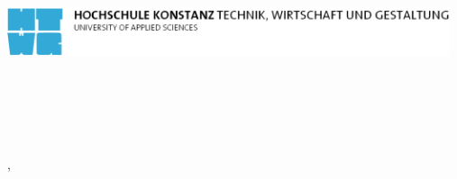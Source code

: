 \begin{titlepage}

\includegraphics[width=13cm]{images/cover/htwg_logo.pdf} \\[0.5cm]
\\[3.5cm]
\begin{center}	

	\Huge{
	
		\textbf{\thema} \\[7.5cm]
	}
	
	
	\LARGE{
		\textbf{\autor}\\
	}
	\autorMatNr \\
		
	\LARGE{
		\ort, \abgabedatum \\[1.5cm]
	}
	
	\Huge{
		\textbf{\ausarbeitung}
	}

\end{center}

\end{titlepage}